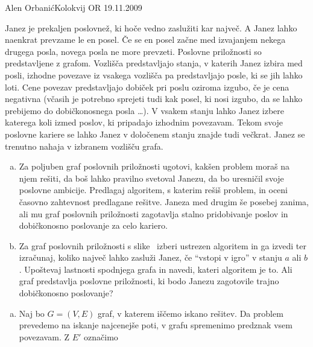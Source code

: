 \begin{naloga}{Alen Orbanić}{Kolokvij OR 19.11.2009}
    \begin{vprasanje}
    Janez je prekaljen poslovnež, ki hoče vedno zaslužiti kar največ.
    A Janez lahko naenkrat prevzame le en posel.
    Če se en posel začne med izvajanjem nekega drugega posla,
    novega posla ne more prevzeti.
    Poslovne priložnosti so predstavljene z grafom.
    Vozlišča predstavljajo stanja, v katerih Janez izbira med posli,
    izhodne povezave iz vsakega vozlišča pa predstavljajo posle,
    ki se jih lahko loti.
    Cene povezav predstavljajo dobiček pri poslu oziroma izgubo,
    če je cena negativna
    (včasih je potrebno sprejeti tudi kak posel, ki nosi izgubo,
    da se lahko prebijemo do dobičkonosnega posla \dots).
    V vsakem stanju lahko Janez izbere katerega koli izmed poslov,
    ki pripadajo izhodnim povezavam.
    Tekom svoje poslovne kariere se lahko Janez
    v določenem stanju znajde tudi večkrat.
    Janez se trenutno nahaja v izbranem vozlišču grafa.
    \begin{enumerate}[(a)]
    \item Za poljuben graf poslovnih priložnosti ugotovi,
    kakšen problem moraš na njem rešiti, da boš lahko pravilno svetoval Janezu,
    da bo uresničil svoje poslovne ambicije.
    Predlagaj algoritem, s katerim rešiš problem,
    in oceni časovno zahtevnost predlagane rešitve.
    Janeza med drugim še posebej zanima,
    ali mu graf poslovnih priložnosti zagotavlja stalno pridobivanje poslov
    in dobičkonosno poslovanje za celo kariero.
    \item Za graf poslovnih priložnosti s slike~\fig
    izberi ustrezen algoritem in ga izvedi ter izračunaj,
    koliko največ lahko zasluži Janez, če ``vstopi v igro'' v stanju $a$ ali $b$.
    Upoštevaj lastnosti spodnjega grafa in navedi, kateri algoritem je to.
    Ali graf predstavlja poslovne priložnosti,
    ki bodo Janezu zagotovile trajno dobičkonosno poslovanje?
    \end{enumerate}
    \begin{slika}
    \pgfslika
    \end{slika}
    \end{vprasanje}
    \begin{odgovor}
    \begin{enumerate}[(a)]
    \item Naj bo $G=(V,E)$ graf, v katerem iščemo iskano rešitev. Da problem prevedemo na 
    iskanje najcenejše poti, v grafu spremenimo predznak vsem povezavam. Z $E'$ označimo

\end{enumerate}
\end{odgovor}
\end{naloga}
